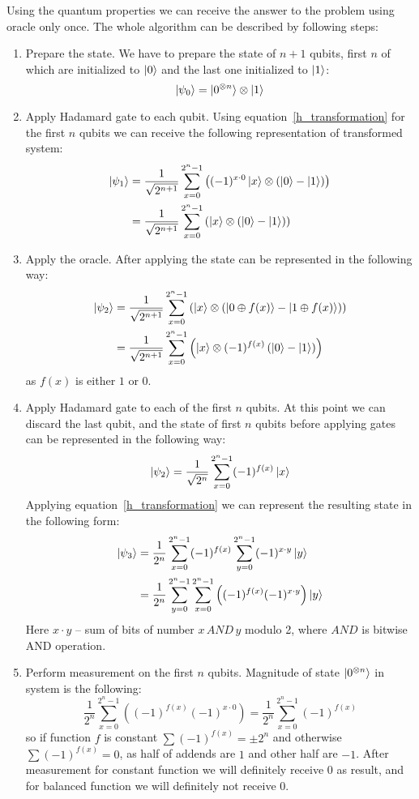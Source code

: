 Using the quantum properties we can receive the answer to the problem using oracle only once.
The whole algorithm can be described by following steps:
\begin{enumerate}
    \item Prepare the state.
    We have to prepare the state of $n+1$ qubits, first $n$ of which are initialized to $\ket{0}$ and the last one initialized to $\ket{1}$:
    \[\ket{\psi_0} = \ket{0^{\otimes n}}\otimes\ket{1}\]
    \item Apply Hadamard gate to each qubit.
    Using equation~\eqref{h_transformation} for the first $n$ qubits we can receive the following representation of transformed system:
    \begin{align*}
        \ket{\psi_1} &= \frac{1}{\sqrt{2^{n+1}}} \sum_{x=0}^{2^n-1}\left((-1)^{x\cdot0}\ket{x}\otimes\left(\ket{0} - \ket{1}\right)\right) \\
        &=\frac{1}{\sqrt{2^{n+1}}} \sum_{x=0}^{2^n-1}\left(\ket{x}\otimes\left(\ket{0} - \ket{1}\right)\right)
    \end{align*}
    \item Apply the oracle.
    After applying the state can be represented in the following way:
    \begin{align*}
        \ket{\psi_2} &= \frac{1}{\sqrt{2^{n+1}}} \sum_{x=0}^{2^n-1}\left(\ket{x}\otimes\left(\ket{0\oplus f(x)} - \ket{1\oplus f(x)}\right)\right) \\
        &=  \frac{1}{\sqrt{2^{n+1}}} \sum_{x=0}^{2^n-1}\left(\ket{x}\otimes(-1)^{f(x)}\left(\ket{0} - \ket{1}\right)\right)
    \end{align*}
    as $f(x)$ is either $1$ or $0$.
    \item Apply Hadamard gate to each of the first $n$ qubits.
    At this point we can discard the last qubit, and the state of first $n$ qubits before applying gates can be represented in the following way:
    \[
        \ket{\psi_2} = \frac{1}{\sqrt{2^{n}}} \sum_{x=0}^{2^n-1}(-1)^{f(x)}\ket{x}
    \]
    Applying equation~\eqref{h_transformation} we can represent the resulting state in the following form:
    \begin{align*}
        \ket{\psi_3} &= \frac{1}{2^{n}} \sum_{x=0}^{2^n-1}(-1)^{f(x)}\sum_{y=0}^{2^n-1}(-1)^{x\cdot y}\ket{y} \\
        &= \frac{1}{2^{n}} \sum_{y=0}^{2^n-1} \sum_{x=0}^{2^n-1}\left((-1)^{f(x)}(-1)^{x\cdot y}\right)\ket{y}
    \end{align*}
    Here $x\cdot y$ -- sum of bits of number $x \, AND \, y$ modulo 2, where $AND$ is bitwise AND operation.
    \item Perform measurement on the first $n$ qubits.
    Magnitude of state $\ket{0^{\otimes n}}$ in system is the following:
    \[
        \frac{1}{2^{n}}\sum_{x=0}^{2^n-1}\left((-1)^{f(x)}(-1)^{x\cdot 0}\right) = \frac{1}{2^{n}}\sum_{x=0}^{2^n-1}(-1)^{f(x)}
    \]
    so if function $f$ is constant $\sum(-1)^{f(x)}=\pm2^n$ and otherwise $\sum(-1)^{f(x)}=0$, as half of addends are $1$ and other half are $-1$.
    After measurement for constant function we will definitely receive $0$ as result, and for balanced function we will definitely not receive $0$.
\end{enumerate}

